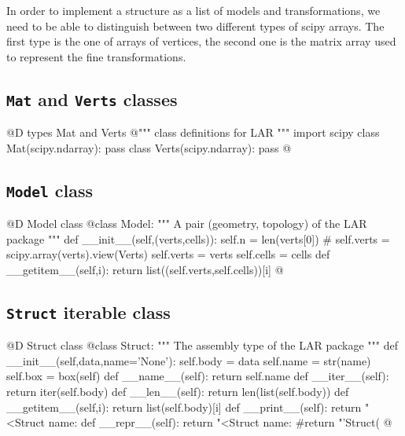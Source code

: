 \documentclass[11pt,oneside]{article}    %
\begin{document}
In order to implement a structure as a list of models and transformations, we need to be able to distinguish between two different types of scipy arrays. The first type is the one of arrays of vertices, the second one is the matrix array used to represent the fine transformations.

\subsection{\texttt{Mat} and \texttt{Verts} classes}
@D types Mat and Verts
@{""" class definitions for LAR """
import scipy
class Mat(scipy.ndarray): pass
class Verts(scipy.ndarray): pass
@}

\subsection{\texttt{Model} class}
@D Model class
@{class Model:
    """ A pair (geometry, topology) of the LAR package """
    def __init__(self,(verts,cells)):
        self.n = len(verts[0])
        # self.verts = scipy.array(verts).view(Verts)
        self.verts = verts
        self.cells = cells
    def __getitem__(self,i):
        return list((self.verts,self.cells))[i]
@}

\subsection{\texttt{Struct} iterable class}
@D Struct class
@{class Struct:
    """ The assembly type of the LAR package """
    def __init__(self,data,name='None'):
        self.body = data
        self.name = str(name)
        self.box = box(self) 
    def __name__(self):
        return self.name
    def __iter__(self):
        return iter(self.body)
    def __len__(self):
        return len(list(self.body))
    def __getitem__(self,i):
        return list(self.body)[i]
    def __print__(self): 
        return "<Struct name: %
    def __repr__(self):
        return "<Struct name: %
        #return "'Struct(%
@}
\end{document}
